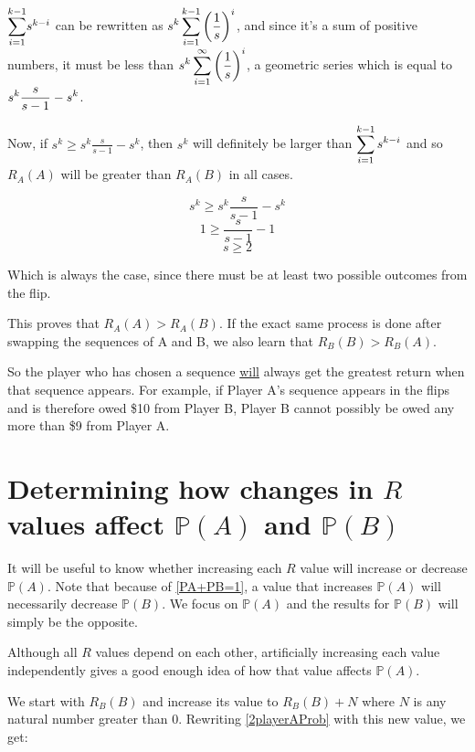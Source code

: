 \documentclass[english,12pt,a4paper,final]{article}
\begin{document}
$\mathlarger\sum_{i=1}^{k-1}s^{k-i}$ can be rewritten as
$\mathlarger{s^k \sum_{i=1}^{k-1}\left(\frac{1}{s}\right)^i}$, and since it's a sum of positive numbers, it must be less than $\mathlarger{s^k\sum_{i=1}^{\infty}\left(\frac{1}{s}\right)^i}$, a geometric series which is equal to $\mathlarger{s^k\frac{s}{s-1} - s^k}$.

Now, if $s^k \ge s^k\frac{s}{s-1} - s^k$, then $s^k$ will definitely be larger than $\mathlarger{\sum_{i=1}^{k-1}s^{k-i}}$ and so $R_A(A)$ will be greater than $R_A(B)$ in all cases.

\begin{equation*}
	s^k \ge s^k\frac{s}{s-1} - s^k
\end{equation*}
\begin{equation*}
	1 \ge \frac{s}{s-1} - 1
\end{equation*}
\begin{equation*}
	s \ge 2
\end{equation*}

Which is always the case, since there must be at least two possible outcomes from the flip.

This proves that ${R_A(A) > R_A(B)}$. If the exact same process is done after swapping the sequences of A and B, we also learn that $R_B(B)>R_B(A)$.

So the player who has chosen a sequence \underline{will} always get the greatest return when that sequence appears. For example, if Player A's sequence appears in the flips and is therefore owed \$10 from Player B, Player B cannot possibly be owed any more than \$9 from Player A.

\section{Determining how changes in $R$ values affect $\mathbb{P}(A)$ and $\mathbb{P}(B)$}

It will be useful to know whether increasing each $R$ value will increase or decrease $\mathbb{P}(A)$. Note that because of \eqref{PA+PB=1}, a value that increases $\mathbb{P}(A)$ will necessarily decrease $\mathbb{P}(B)$. We focus on $\mathbb{P}(A)$ and the results for $\mathbb{P}(B)$ will simply be the opposite.

Although all $R$ values depend on each other, artificially increasing each value independently gives a good enough idea of how that value affects $\mathbb{P}(A)$.

We start with $R_B(B)$ and increase its value to $R_B(B) + N$ where $N$ is any natural number greater than 0. Rewriting \eqref{2playerAProb} with this new value, we get:
\end{document}
